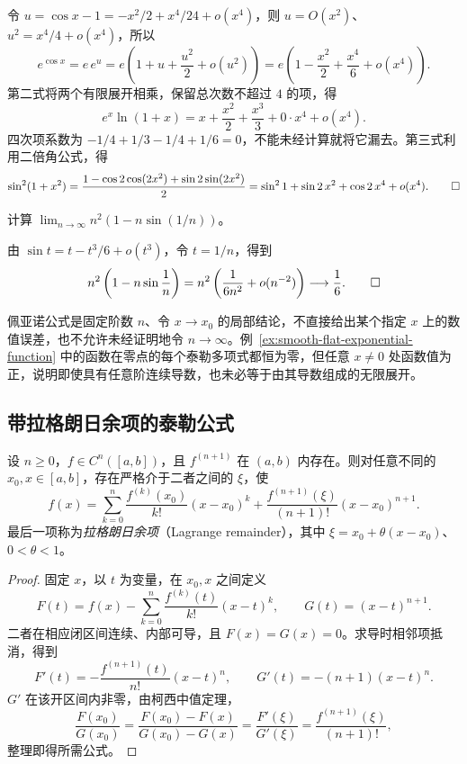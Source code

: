 \begin{solve}
令 $u=\cos x-1=-x^2/2+x^4/24+o(x^4)$，则 $u=O(x^2)$、$u^2=x^4/4+o(x^4)$，所以
\[
    e^{\cos x}=e\,e^u
    =e\left(1+u+\frac{u^2}{2}+o(u^2)\right)
    =e\left(1-\frac{x^2}{2}+\frac{x^4}{6}+o(x^4)\right).
\]
第二式将两个有限展开相乘，保留总次数不超过 $4$ 的项，得
\[
    e^x\ln(1+x)=x+\frac{x^2}{2}+\frac{x^3}{3}+0\cdot x^4+o(x^4).
\]
四次项系数为 $-1/4+1/3-1/4+1/6=0$，不能未经计算就将它漏去。第三式利用二倍角公式，得
\[
    \sin^2(1+x^2)
    =\frac{1-\cos2\cos(2x^2)+\sin2\sin(2x^2)}2
    =\sin^21+\sin2\,x^2+\cos2\,x^4+o(x^4).
    \qedhere
\]
\end{solve}

\begin{example}
\label{ex:taylor-peano-sequence-limit}
计算 $\lim_{n\to\infty}n^2(1-n\sin(1/n))$。
\end{example}

\begin{solve}
由 $\sin t=t-t^3/6+o(t^3)$，令 $t=1/n$，得到
\[
    n^2\left(1-n\sin\frac1n\right)
    =n^2\left(\frac1{6n^2}+o(n^{-2})\right)\longrightarrow\frac16.
    \qedhere
\]
\end{solve}

佩亚诺公式是固定阶数 $n$、令 $x\to x_0$ 的局部结论，不直接给出某个指定 $x$ 上的数值误差，也不允许未经证明地令 $n\to\infty$。例~\ref{ex:smooth-flat-exponential-function} 中的函数在零点的每个泰勒多项式都恒为零，但任意 $x\neq0$ 处函数值为正，说明即使具有任意阶连续导数，也未必等于由其导数组成的无限展开。

\subsection{带拉格朗日余项的泰勒公式}
\label{subsec:taylor-formula-with-lagrange-remainder}

\begin{theorem}[带拉格朗日余项的泰勒公式]
\label{thm:taylor-lagrange}
设 $n\geq0$，$f\in C^n([a,b])$，且 $f^{(n+1)}$ 在 $(a,b)$ 内存在。则对任意不同的 $x_0,x\in[a,b]$，存在严格介于二者之间的 $\xi$，使
\begin{equation}
    f(x)=\sum_{k=0}^n\frac{f^{(k)}(x_0)}{k!}(x-x_0)^k
       +\frac{f^{(n+1)}(\xi)}{(n+1)!}(x-x_0)^{n+1}.
    \label{eq:taylor-lagrange}
\end{equation}
最后一项称为\emph{拉格朗日余项}（Lagrange remainder），其中 $\xi=x_0+\theta(x-x_0)$、$0<\theta<1$。
\end{theorem}

\begin{proof}
固定 $x$，以 $t$ 为变量，在 $x_0,x$ 之间定义
\[
    F(t)=f(x)-\sum_{k=0}^n\frac{f^{(k)}(t)}{k!}(x-t)^k,
    \qquad G(t)=(x-t)^{n+1}.
\]
二者在相应闭区间连续、内部可导，且 $F(x)=G(x)=0$。求导时相邻项抵消，得到
\[
    F'(t)=-\frac{f^{(n+1)}(t)}{n!}(x-t)^n,
    \qquad G'(t)=-(n+1)(x-t)^n.
\]
$G'$ 在该开区间内非零，由柯西中值定理，
\[
    \frac{F(x_0)}{G(x_0)}
    =\frac{F(x_0)-F(x)}{G(x_0)-G(x)}
    =\frac{F'(\xi)}{G'(\xi)}
    =\frac{f^{(n+1)}(\xi)}{(n+1)!},
\]
整理即得所需公式。
\end{proof}

